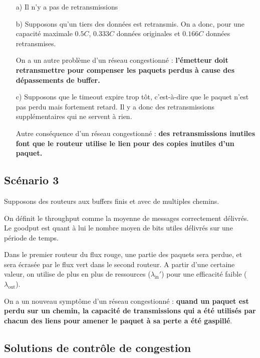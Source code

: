	\begin{itemize}
		\item[a)] Il n'y a pas de retransmissions
		\item[b)] Supposons qu'un tiers des données est retransmis. On a donc, pour une capacité maximale $0.5 C$, $0.333 C$ données originales et $0.166 C$ données retransmises.
	
		On a un autre problème d'un réseau congestionné : \textbf{l'émetteur doit retransmettre pour compenser les paquets perdus à cause des dépassements de buffer.}
	
		\item[c) ] Supposons que le timeout expire trop tôt, c'est-à-dire que le paquet n'est pas perdu mais fortement retard. Il y a donc des retransmissions supplémentaires qui ne servent à rien.
		
		Autre conséquence d'un réseau congestionné : \textbf{des retransmissions inutiles font que le routeur utilise le lien pour des copies inutiles d'un paquet.}
	\end{itemize}		
	
	\subsection{Scénario 3}

	Supposons des routeurs aux buffers finis et avec de multiples chemins.
	
	On définit le throughput comme la moyenne de messages correctement délivrés. Le goodput est quant à lui le nombre moyen de bits utiles délivrés sur une période de temps.
	
	
	

	Dans le premier routeur du flux rouge, une partie des paquets sera perdue, et sera écrasée par le flux vert dans le second routeur. A partir d'une certaine valeur, on utilise de plus en plus de ressources ($\lambda_{\text{in}}'$) pour une efficacité faible ($\lambda_{\text{out}}$).
	
	On a un nouveau symptôme d'un réseau congestionné : \textbf{quand un paquet est perdu sur un chemin, la capacité de transmissions qui a été utilisés par chacun des liens pour amener le paquet à sa perte a été gaspillé}.
	

	\subsection{Solutions de contrôle de congestion}
	
